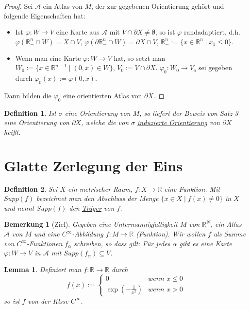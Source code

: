 \documentclass[10pt,a4paper]{report}
\newtheorem*{lemma}{Lemma}
\newtheorem*{defi}{Definition}
\newtheorem*{remark}{Bemerkung}
\begin{document}
\begin{proof}
  Sei $\mathscr{A}$ ein Atlas von $M$, der zur gegebenen Orientierung gehört und folgende Eigenschaften hat:
  \begin{itemize}
  \item Ist $\varphi : W \rightarrow V$ eine Karte aus $\mathscr{A}$ mit $V \cap \partial X \ne \emptyset$, so ist $\varphi$ randadaptiert, d.h. $\varphi(\mathbb{R}_{-}^{n} \cap W) = X \cap V$, $\varphi(\partial \mathbb{R}_{-}^{n} \cap W) = \partial X \cap V$, $\mathbb{R}_{-}^{n} := \{ x \in \mathbb{R}^{n} \mid x_{1} \le 0 \}$.
  \item Wenn man eine Karte $\varphi : W \rightarrow V$ hat, so setzt man $W_{0} := \{ x \in \mathbb{R}^{n - 1} \mid (0, x) \in W \}$, $V_{0} := V \cap \partial X$.
    $\varphi_{0} : W_{0} \rightarrow V_{o}$ sei gegeben durch $\varphi_{0}(x) := \varphi(0, x)$.
  \end{itemize}
  Dann bilden die $\varphi_{0}$ eine orientierten Atlas von $\partial X$.
\end{proof}

\begin{defi}
  Ist $\sigma$ eine Orientierung von $M$, so liefert der Beweis von Satz 3 eine Orientierung von $\partial X$, welche die von $\sigma$ \underline{induzierte Orientierung} von $\partial X$ heißt.
\end{defi}

\section{Glatte Zerlegung der Eins}

\begin{defi}
  Sei $X$ ein metrischer Raum, $f : X \rightarrow \mathbb{R}$ eine Funktion.
  Mit $Supp(f)$ bezeichnet man den Abschluss der Menge $\{ x \in X \mid f(x) \ne 0 \}$ in $X$ und nennt $Supp(f)$ den \underline{Träger} von $f$.
\end{defi}

\begin{remark}[Ziel]
  Gegeben eine Untermannigfaltigkeit $M$ von $\mathbb{R}^{N}$, ein Atlas $\mathscr{A}$ von $M$ und eine $C^{\infty}$-Abbildung $f : M \rightarrow \mathbb{R}$ (Funktion).
  Wir wollen $f$ als Summe von $C^{\infty}$-Funktionen $f_{\alpha}$ schreiben, so dass gilt: Für jedes $\alpha$ gibt es eine Karte $\varphi : W \rightarrow V$ in $\mathscr{A}$ mit $Supp(f_{\alpha}) \subseteq V$.
\end{remark}

\begin{lemma}
  Definiert man $f : \mathbb{R} \rightarrow \mathbb{R}$ durch
  \begin{equation}
    f(x) := \begin{cases}
      0 & \textit{wenn $x \le 0$}\\
      \exp(-\frac{1}{x^{2}}) & \textit{wenn $x > 0$}
    \end{cases}
  \end{equation}
  so ist $f$ von der Klsse $C^{\infty}$.
\end{lemma}
\end{document}
